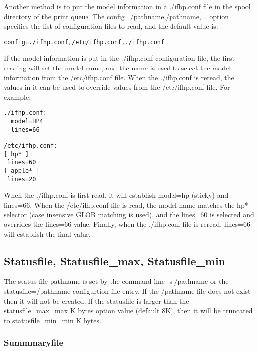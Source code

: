 \documentclass[a4paper]{article}
\begin{document}
Another method is to put the model information in a
{\ttfamily ./ifhp.conf}
file in the spool directory of the print queue.
The
{\ttfamily config=/pathname,/pathname,...}
option specifies the list of configuration files to read,
and the default value is:
\begin{tscreen}
\begin{verbatim}
config=./ifhp.conf,/etc/ifhp.conf,./ifhp.conf
\end{verbatim}
\end{tscreen}


If the model information is put in the 
{\ttfamily ./ifhp.conf}
configuration file,
the first reading will set the model name,
and the name is used to select the model information from the
{\ttfamily /etc/ifhp.conf}
file.
When the 
{\ttfamily ./ifhp.conf}
is reread,  the values in it can be used to override values from the
{\ttfamily /etc/ifhp.conf}
file.
For example:
\begin{tscreen}
\begin{verbatim}
./ifhp.conf:
  model=HP4
  lines=66

/etc/ifhp.conf:
[ hp* ]
 lines=60
[ apple* ]
 lines=20
\end{verbatim}
\end{tscreen}


When the
{\ttfamily ./ifhp.conf}
is first read,
it will establish
{\ttfamily model=hp}
(sticky) and 
{\ttfamily lines=66}.
When the
{\ttfamily /etc/ifhp.conf} file is read,
the model name matches the
{\ttfamily hp*} selector
(case insensive GLOB matching is used),
and the
{\ttfamily lines=60}
is selected and overrides the
{\ttfamily lines=66}
value.
Finally,
when the
{\ttfamily ./ifhp.conf}
file is reread,
{\ttfamily lines=66}
will establish the final value.


\subsection{Statusfile, Statusfile\_max, Statusfile\_min
\label{statusfile}
\label{statusfile_max}
\label{statusfile_min}}

The status file pathname is set by the command line
{\ttfamily -s /pathname}
or the
{\ttfamily statusfile=/pathname}
configurtion file entry.
If the
{\ttfamily /pathname}
file does not exist then it will not be created.
If the statusfile is larger than the
{\ttfamily statusfile\_max=max}
K bytes option value (default 8K),
then it will be truncated to
{\ttfamily statusfile\_min=min}
K bytes.


\subsubsection{Summmaryfile}
\end{document}
